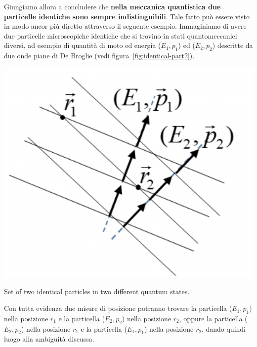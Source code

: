 Giungiamo allora a concludere che \textbf{nella meccanica quantistica
due particelle identiche sono sempre indistinguibili}.
Tale fatto può
essere visto in modo ancor più diretto attraverso il seguente esempio.
Immaginiamo di avere due particelle microscopiche identiche che
si trovino in stati quantomeccanici diversi, ad esempio di quantità di
moto ed energia (\(E_1, p_1\)) ed (\(E_2, p_2\)) descritte da due onde
piane di De Broglie (vedi figura~\ref{fig:identical-part2}).
\begin{marginfigure}
    \includegraphics{figs/identical-part2}
    \caption{Set of two identical particles in two different quantum states.}
    \label{fig:identical-part2}
\end{marginfigure}
Con tutta evidenza due misure di posizione potranno trovare la
particella (\(E_{1},p_{1}\)) nella posizione \(r_{1}\) e la particella
(\(E_{2},p_{2}\)) nella posizione \(r_{2}\), oppure la particella
(\(E_{2}, p_{2}\)) nella posizione \(r_{1}\) e la particella
(\(E_{1}, p_{1}\)) nella posizione \(r_{2}\), dando quindi luogo alla
ambiguità discussa.
\bigskip

